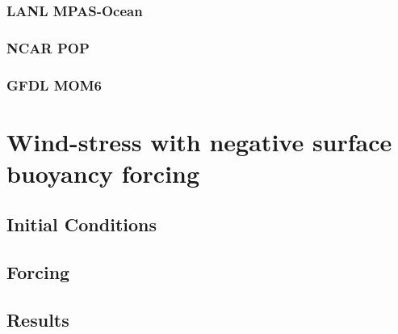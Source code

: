 \documentclass[fleqn, 12pt]{report}
\begin{document}
\subsection{LANL MPAS-Ocean}
\subsection{NCAR POP}
\subsection{GFDL MOM6}

\chapter{Wind-stress with negative surface buoyancy forcing}

\section{Initial Conditions}

\section{Forcing}

\section{Results}

%
%
\end{document}
